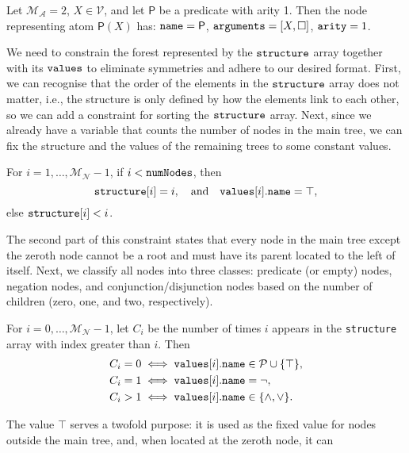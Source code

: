 \documentclass[runningheads]{llncs}
\newcommand{\variable}[1]{\texttt{\textup{#1}}}
\newcommand{\predicates}{\mathcal{P}}
\newcommand{\variables}{\mathcal{V}}
\newcommand{\maxArity}{\mathcal{M}_{\mathcal{A}}}
\newcommand{\maxNumNodes}{\mathcal{M}_{\mathcal{N}}}
\begin{document}
\begin{example}
  Let $\maxArity{} = 2$, $X \in \variables{}$, and let $\mathsf{P}$ be a
  predicate with arity 1. Then the node representing atom $\mathsf{P}(X)$ has:
    $\variable{name} = \mathsf{P}$, $\variable{arguments} = [X, \Box]$,
    $\variable{arity} = 1$.
\end{example}

We need to constrain the forest represented by the $\variable{structure}$
array together with its $\variable{values}$ to eliminate symmetries and adhere
to our desired format. First, we can recognise that the order of the elements in
the $\variable{structure}$ array does not matter, i.e., the structure is only
defined by how the elements link to each other, so we can add a constraint for
sorting the $\variable{structure}$ array. Next, since we already have a
variable that counts the number of nodes in the main tree, we can fix the
structure and the values of the remaining trees to some constant values.
\begin{constraint}
  For $i = 1, \dots, \maxNumNodes{} - 1$, if $i < \variable{numNodes}$, then
  \[
    \variable{structure}[i] = i, \quad \text{and} \quad
    \variable{values}[i].\variable{name} = \top,
  \]
  else $\variable{structure}[i] < i$.
\end{constraint}
The second part of this constraint states that every node in the main tree
except the zeroth node cannot be a root and must have its parent located to
the left of itself. Next, we classify all nodes into three classes: predicate
(or empty) nodes, negation nodes, and conjunction/disjunction nodes based on the
number of children (zero, one, and two, respectively).
\begin{constraint} \label{constraint:node_types}
  For $i = 0, \dots, \maxNumNodes{} - 1$, let $C_i$ be the number of times $i$
  appears in the \variable{structure} array with index greater than $i$. Then
  \begin{align*}
    C_i = 0 &\iff \variable{values}[i].\variable{name} \in \predicates{} \cup \{ \top \},\\
    C_i = 1 &\iff \variable{values}[i].\variable{name} = \neg,\\
    C_i > 1 &\iff \variable{values}[i].\variable{name} \in \{ \land, \lor \}.
  \end{align*}
\end{constraint}
The value $\top$ serves a twofold purpose: it is used as the fixed value for
nodes outside the main tree, and, when located at the zeroth node, it can
\end{document}
